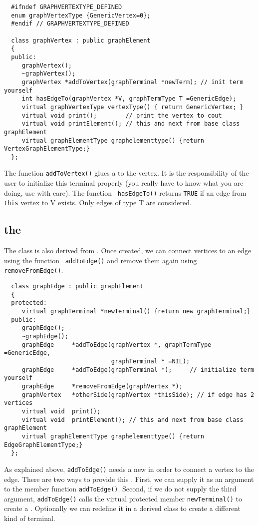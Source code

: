{\footnotesize \begin{verbatim}
  #ifndef GRAPHVERTEXTYPE_DEFINED
  enum graphVertexType {GenericVertex=0};
  #endif // GRAPHVERTEXTYPE_DEFINED

  class graphVertex : public graphElement
  {
  public:
     graphVertex();
     ~graphVertex();
     graphVertex *addToVertex(graphTerminal *newTerm); // init term yourself
     int hasEdgeTo(graphVertex *V, graphTermType T =GenericEdge);
     virtual graphVertexType vertexType() { return GenericVertex; }
     virtual void print();        // print the vertex to cout
     virtual void printElement(); // this and next from base class graphElement
     virtual graphElementType graphelementtype() {return VertexGraphElementType;}
  };
\end{verbatim}}

The function {\tt addToVertex()} glues a  to the vertex.
It is the responsibility of the user to initialize this terminal properly (you
really have to know what you are doing, use with care).  The function {\tt
hasEdgeTo()} returns {\tt TRUE} if an edge from {\tt this} vertex to V exists.
Only edges of type T are considered.

\subsection{the }
The  class is also derived from . Once
created, we can connect vertices to an edge using the function {\tt
addToEdge()} and remove them again using {\tt removeFromEdge()}.

{\footnotesize \begin{verbatim}
  class graphEdge : public graphElement
  {
  protected:
     virtual graphTerminal *newTerminal() {return new graphTerminal;}
  public:
     graphEdge();
     ~graphEdge();
     graphEdge     *addToEdge(graphVertex *, graphTermType =GenericEdge,
                              graphTerminal * =NIL);
     graphEdge     *addToEdge(graphTerminal *);     // initialize term yourself
     graphEdge     *removeFromEdge(graphVertex *);
     graphVertex   *otherSide(graphVertex *thisSide); // if edge has 2 vertices
     virtual void  print();
     virtual void  printElement(); // this and next from base class graphElement
     virtual graphElementType graphelementtype() {return EdgeGraphElementType;}
  };
\end{verbatim}}

As explained above, {\tt addToEdge()} needs a new  in
order to connect a vertex to the edge. There are two ways to provide this
. First, we can supply it as an argument to the member
function {\tt addToEdge()}. Second, if we do not supply the third argument,
{\tt addToEdge()} calls the virtual protected member {\tt newTerminal()} to
create a . Optionally we can redefine it in a derived
class to create a different kind of terminal.

